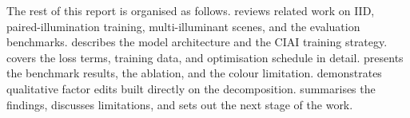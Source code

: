 The rest of this report is organised as follows.
 reviews related work on IID, paired-illumination training,
multi-illuminant scenes, and the evaluation benchmarks.
 describes the model architecture and the CIAI training strategy.
 covers the loss terms, training data, and optimisation
schedule in detail.
 presents the benchmark results, the ablation, and the colour
limitation.
 demonstrates qualitative factor edits built directly on the
decomposition.
 summarises the findings, discusses limitations, and
sets out the next stage of the work.
